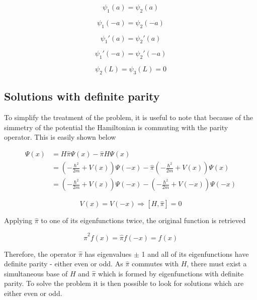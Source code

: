 \documentclass{article}
\begin{document}
\begin{equation}
\label{eq:continuity}
\psi_{1}(a) =  \psi_{2}(a)
\end{equation}

\begin{equation}
\psi_{1}(-a) =  \psi_{2}(-a)
\end{equation}

\begin{equation}
\label{eq:continuity_derivative}
\psi_{1}'(a) =  \psi_{2}'(a)
\end{equation}

\begin{equation}
\psi_{1}'(-a) =  \psi_{2}'(-a)
\end{equation}

\begin{equation}
\label{eq:null_bound}
\psi_{2}(L) =  \psi_{3}(L) = 0
\end{equation}

\subsection{Solutions with definite parity}
To simplify the treatment of the problem, it is useful to note that because of the simmetry of the potential the Hamiltonian is commuting with the parity operator. This is easily shown below

\begin{align*}
[H, \hat{\pi}] \Psi(x) & = H \hat{\pi} \Psi(x) - \hat{\pi} H \Psi(x) \\ 
  & = \left(-\frac{\hbar^2}{2m} + V(x)\right)\Psi(-x) -  \hat{\pi} \left(-\frac{\hbar^2}{2m} + V(x)\right)\Psi(x) \\ & = \left(-\frac{\hbar^2}{2m} + V(x)\right)\Psi(-x) -  \left(-\frac{\hbar^2}{2m} + V(-x)\right)\Psi(-x)
\end{align*}

\begin{equation}
\label{eq:parity_commutation}
V(x) = V(-x) \Rightarrow \left[H,\hat{\pi} \right] = 0
\end{equation}

Applying \(\hat{\pi}\) to one of its eigenfunctions twice, the original function is retrieved

\begin{equation}
\hat{\pi}^2f(x) = \hat{\pi}f(-x) = f(x)
\end{equation}

Therefore, the operator \(\hat{\pi}\) has eigenvalues \(\pm\) 1 and all of its eigenfunctions have definite parity - either even or odd. As \(\hat{\pi}\) commutes with \(H\), there must exist a simultaneous base of \(H\) and \(\hat{\pi}\) which is formed by eigenfunctions with definite parity. To solve the problem it is then possible to look for solutions which are either even or odd.
\end{document}
